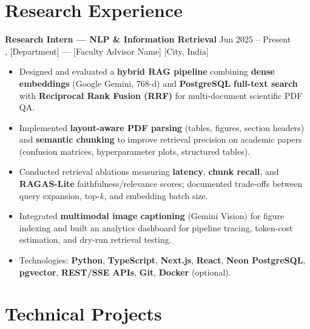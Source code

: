 \documentclass[11pt,letterpaper]{article}
\begin{document}
\section{Research Experience}
\textbf{Research Intern --- NLP \& Information Retrieval} \hfill Jun 2025 -- Present \\
[Lab / Institute Name], [Department] --- [Faculty Advisor Name] \hfill [City, India]
\begin{itemize}
  \item Designed and evaluated a \textbf{hybrid RAG pipeline} combining \textbf{dense embeddings} (Google Gemini, 768-d) and \textbf{PostgreSQL full-text search} with \textbf{Reciprocal Rank Fusion (RRF)} for multi-document scientific PDF QA.
  \item Implemented \textbf{layout-aware PDF parsing} (tables, figures, section headers) and \textbf{semantic chunking} to improve retrieval precision on academic papers (confusion matrices, hyperparameter plots, structured tables).
  \item Conducted retrieval ablations measuring \textbf{latency}, \textbf{chunk recall}, and \textbf{RAGAS-Lite} faithfulness/relevance scores; documented trade-offs between query expansion, top-$k$, and embedding batch size.
  \item Integrated \textbf{multimodal image captioning} (Gemini Vision) for figure indexing and built an analytics dashboard for pipeline tracing, token-cost estimation, and dry-run retrieval testing.
  \item Technologies: \textbf{Python}, \textbf{TypeScript}, \textbf{Next.js}, \textbf{React}, \textbf{Neon PostgreSQL}, \textbf{pgvector}, \textbf{REST/SSE APIs}, \textbf{Git}, \textbf{Docker} (optional).
\end{itemize}

\section{Technical Projects}
\end{document}
